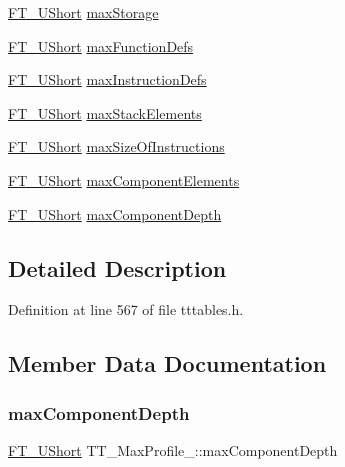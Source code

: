 \begin{DoxyCompactItemize}
\mbox{\hyperlink{fttypes_8h_a937f6c17cf5ffd09086d8610c37b9f58}{F\+T\+\_\+\+U\+Short}} \mbox{\hyperlink{struct_t_t___max_profile___a502a8579e3d358f3c00776ed0cc8a168}{max\+Storage}}
\item 
\mbox{\hyperlink{fttypes_8h_a937f6c17cf5ffd09086d8610c37b9f58}{F\+T\+\_\+\+U\+Short}} \mbox{\hyperlink{struct_t_t___max_profile___acc24e822a62bbfaa86d36f691fcde60b}{max\+Function\+Defs}}
\item 
\mbox{\hyperlink{fttypes_8h_a937f6c17cf5ffd09086d8610c37b9f58}{F\+T\+\_\+\+U\+Short}} \mbox{\hyperlink{struct_t_t___max_profile___a3f7bd433baede417293415cf60f20d8f}{max\+Instruction\+Defs}}
\item 
\mbox{\hyperlink{fttypes_8h_a937f6c17cf5ffd09086d8610c37b9f58}{F\+T\+\_\+\+U\+Short}} \mbox{\hyperlink{struct_t_t___max_profile___a2df9b9ff2a5a9daaa7c3d40fe024637f}{max\+Stack\+Elements}}
\item 
\mbox{\hyperlink{fttypes_8h_a937f6c17cf5ffd09086d8610c37b9f58}{F\+T\+\_\+\+U\+Short}} \mbox{\hyperlink{struct_t_t___max_profile___ac458411198b09d303ec8ae206e6926b6}{max\+Size\+Of\+Instructions}}
\item 
\mbox{\hyperlink{fttypes_8h_a937f6c17cf5ffd09086d8610c37b9f58}{F\+T\+\_\+\+U\+Short}} \mbox{\hyperlink{struct_t_t___max_profile___a110e6d735610c6d8fd89221d03440c32}{max\+Component\+Elements}}
\item 
\mbox{\hyperlink{fttypes_8h_a937f6c17cf5ffd09086d8610c37b9f58}{F\+T\+\_\+\+U\+Short}} \mbox{\hyperlink{struct_t_t___max_profile___a9ae1f117c954e0711b03f1675d6191d9}{max\+Component\+Depth}}
\end{DoxyCompactItemize}


\subsection{Detailed Description}


Definition at line 567 of file tttables.\+h.



\subsection{Member Data Documentation}
\mbox{\label{struct_t_t___max_profile___a9ae1f117c954e0711b03f1675d6191d9}} 
\subsubsection{\texorpdfstring{maxComponentDepth}{maxComponentDepth}}
{\footnotesize\ttfamily \mbox{\hyperlink{fttypes_8h_a937f6c17cf5ffd09086d8610c37b9f58}{F\+T\+\_\+\+U\+Short}} T\+T\+\_\+\+Max\+Profile\+\_\+\+::max\+Component\+Depth}



